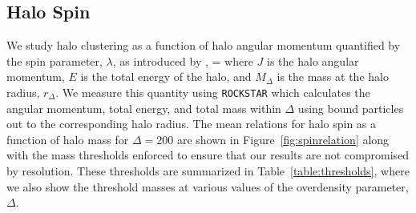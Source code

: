 \documentclass[usenatbib]{mnras}
\begin{document}
\subsection{Halo Spin}

We study halo clustering as a function of halo angular momentum quantified 
by the spin parameter, $\lambda$, as introduced by \citep{peebles69},
\beq
\lambda = 
\eeq
where $J$ is the halo angular momentum, $E$ is the total energy of the 
halo, and $M_{\Delta}$ is the mass at the halo radius, $r_{\Delta}$. We measure
this quantity using {\tt ROCKSTAR} which calculates the angular momentum, total energy,
and total mass within $\Delta$ using bound particles out to the corresponding halo radius.
The mean relations for halo spin as a function of halo mass for $\Delta=200$ 
are shown in Figure~\ref{fig:spinrelation} along with the mass thresholds 
enforced to ensure that our results are not compromised by resolution. 
These thresholds are summarized in Table~\ref{table:thresholds}, where 
we also show the threshold masses at various values of the overdensity 
parameter, $\Delta$.
\end{document}
